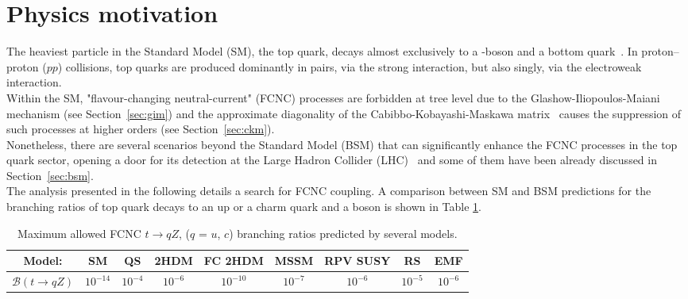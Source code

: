 \section{Physics motivation}
The heaviest particle in the Standard Model (SM), the top quark, decays almost exclusively to a \PW-boson and a bottom quark~\cite{pdg2}. In proton--proton ($pp$) collisions, top quarks are produced dominantly in pairs, via the strong interaction, but also singly, via the electroweak interaction. \\%
Within the SM, "flavour-changing neutral-current" (FCNC) processes are forbidden at tree level due to the Glashow-Iliopoulos-Maiani mechanism \cite{gim} (see Section~\ref{sec:gim}) and the approximate diagonality of the Cabibbo-Kobayashi-Maskawa matrix~\cite{pdg2} causes the suppression of such processes at higher orders (see Section~\ref{sec:ckm}).\\
Nonetheless, there are several scenarios beyond the Standard Model (BSM) that can significantly enhance the FCNC processes in the top quark sector, opening a door for its detection at the Large Hadron Collider (LHC)~\cite{aguilar,barger,h2dm_limit,mssm_limit,RPV_limit, extra_limit} and some of them have been already discussed in Section~\ref{sec:bsm}. \\
The analysis presented in the following details a search for FCNC \tZc coupling. A comparison between SM and BSM predictions for the branching ratios of top quark decays to an up or a charm quark and a \PZ boson is shown in Table \ref{tab:intro-fcnc-br-th}.\\

\begin{table}[h]
	\begin{adjustbox}{max width=1.\textwidth,center}
		\begin{tabular}{ccccccccc}
			\hline 
			Model:&  			                         SM&  				   QS&  			   2HDM&  				FC 2HDM				& MSSM 			&  RPV SUSY			&  			RS				& EMF \\ 
			\hline 
			$\mathcal{B}(t\rightarrow qZ)$ & $10^{-14}$     & $10^{-4}$ &  $10^{-6}$          & $10^{-10}$  & $10^{-7}$      &$10^{-6}$            & $10^{-5}$           & $10^{-6}$  \\ 
			\hline 
		\end{tabular} 
	\end{adjustbox}
	\caption{Maximum allowed FCNC $t\rightarrow qZ$, ($q$ = $u$, $c$) branching ratios predicted by several models\cite{tcZ_sm,qs_limit,h2dm_limit,mssm_limit,RPV_limit,extra_limit,rs_limit,report_limit}.}
	\label{tab:intro-fcnc-br-th}
\end{table} 

